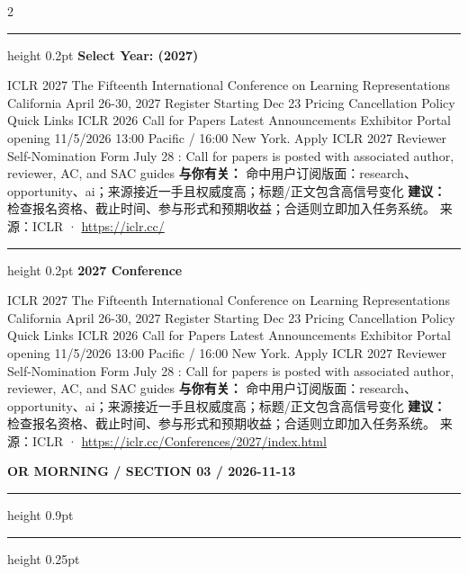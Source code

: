 \documentclass[10.5pt]{ctexart}
\begin{document}
\begin{multicols}{2}
\vspace{2mm}
\hrule height 0.2pt
\vspace{2mm}
{\large\bfseries Select Year: (2027)}\par
ICLR 2027 The Fifteenth International Conference on Learning Representations California April 26-30, 2027 Register Starting Dec 23 Pricing Cancellation Policy Quick Links ICLR 2026 Call for Papers Latest Announcements Exhibitor Portal opening 11/5/2026 13:00 Pacific / 16:00 New York. Apply ICLR 2027 Reviewer Self-Nomination Form July 28 : Call for papers is posted with associated author, reviewer, AC, and SAC guides 
\textbf{与你有关：} 命中用户订阅版面：research、opportunity、ai；来源接近一手且权威度高；标题/正文包含高信号变化
\textbf{建议：} 检查报名资格、截止时间、参与形式和预期收益；合适则立即加入任务系统。
{\footnotesize\color{ormuted} 来源：ICLR · \url{https://iclr.cc/}}
\vspace{2mm}
\hrule height 0.2pt
\vspace{2mm}
{\large\bfseries 2027 Conference}\par
ICLR 2027 The Fifteenth International Conference on Learning Representations California April 26-30, 2027 Register Starting Dec 23 Pricing Cancellation Policy Quick Links ICLR 2026 Call for Papers Latest Announcements Exhibitor Portal opening 11/5/2026 13:00 Pacific / 16:00 New York. Apply ICLR 2027 Reviewer Self-Nomination Form July 28 : Call for papers is posted with associated author, reviewer, AC, and SAC guides 
\textbf{与你有关：} 命中用户订阅版面：research、opportunity、ai；来源接近一手且权威度高；标题/正文包含高信号变化
\textbf{建议：} 检查报名资格、截止时间、参与形式和预期收益；合适则立即加入任务系统。
{\footnotesize\color{ormuted} 来源：ICLR · \url{https://iclr.cc/Conferences/2027/index.html}}
\end{multicols}
\newpage
{\small\bfseries OR MORNING / SECTION 03 / 2026-11-13}
\vspace{2mm}
\hrule height 0.9pt
\vspace{1.5mm}
\hrule height 0.25pt
\vspace{4mm}
\end{document}
